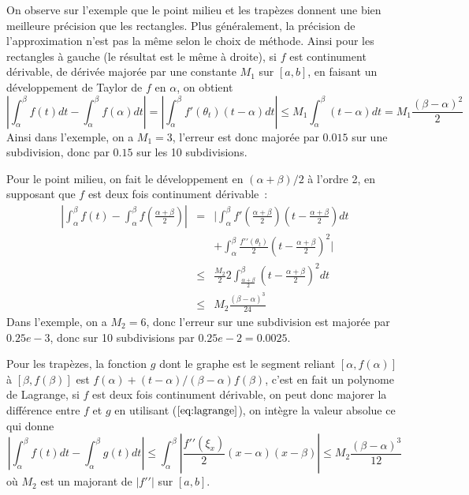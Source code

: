 \documentclass[a4paper,11pt]{article}
\begin{document}
\begin{giacjshere}
On observe sur l'exemple que le point milieu et les trapèzes donnent
une bien meilleure précision que les rectangles. Plus généralement,
la précision de l'approximation n'est pas la même selon le choix
de méthode.
Ainsi pour les rectangles à gauche (le résultat est le même
à droite), si $f$ est continument dérivable, de dérivée majorée
par une constante $M_1$ sur $[a,b]$, en faisant un
développement de Taylor de $f$ en $\alpha$, on obtient
\[ |\int_{\alpha}^{\beta} f(t) dt - \int_{\alpha}^{\beta} f(\alpha) dt |
= | \int_{\alpha}^{\beta} f'(\theta_t)(t-\alpha) dt |
\leq M_1 \int_{\alpha}^{\beta} (t-\alpha) dt = M_1\frac{(\beta-\alpha)^2}{2}
\]
Ainsi dans l'exemple, on a $M_1=3$, l'erreur est donc majorée par $0.015$
sur une subdivision, donc par $0.15$ sur les 10 subdivisions.

Pour le point milieu, on fait le développement en $(\alpha+\beta)/2$ à l'ordre
2, en supposant que $f$ est deux fois continument dérivable~:
\begin{eqnarray*}
 |\int_{\alpha}^{\beta} f(t)  - \int_{\alpha}^{\beta} f(\frac{\alpha+\beta}{2})  |
&= &| \int_{\alpha}^{\beta} f'(\frac{\alpha+\beta}{2})(t-\frac{\alpha+\beta}{2}) dt
\\
& &
+  \int_{\alpha}^{\beta} \frac{f'{'}(\theta_t)}{2}(t-\frac{\alpha+\beta}{2})^2 |
\\
&\leq & \frac{M_2}{2} 2 \int_{\frac{\alpha+\beta}{2}}^{\beta}
(t-\frac{\alpha+\beta}{2})^2 dt  \\
& \leq & M_2\frac{(\beta-\alpha)^3}{24}
\end{eqnarray*}
Dans l'exemple, on a $M_2=6$, donc l'erreur sur une subdivision est
majorée par $0.25e-3$, donc sur 10 subdivisions par $0.25e-2=0.0025$.

Pour les trapèzes, la fonction $g$ dont le graphe est le segment reliant
$[\alpha,f(\alpha)]$ à $[\beta,f(\beta)]$ est $f(\alpha)+(t-\alpha)/(\beta-\alpha)f(\beta)$,
c'est en fait un polynome de Lagrange, si $f$ est deux fois continument
dérivable, on peut donc majorer la différence
entre $f$ et $g$ en utilisant (\(\ref{eq:lagrange}\)), on intègre la valeur
absolue ce qui donne
\[ |\int_{\alpha}^{\beta} f(t) dt - \int_{\alpha}^{\beta} g(t) dt |
\leq \int_{\alpha}^{\beta} |\frac{f'{'}(\xi_x)}{2} (x-\alpha)(x-\beta)|
\leq M_2 \frac{(\beta-\alpha)^3}{12} \]
où $M_2$ est un majorant de $|f'{'}|$ sur $[a,b]$.


\end{giacjshere}
\end{document}
